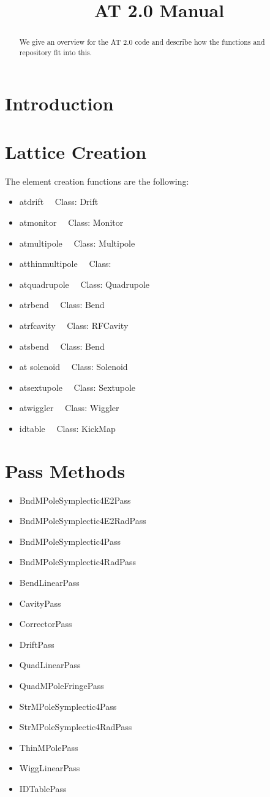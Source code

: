 \documentclass[acus]{article}
\begin{document}
\title{AT 2.0 Manual}
\maketitle
\begin{abstract}
We give an overview for the AT 2.0 code and describe how the functions and repository fit into this.
\end{abstract}


\section{Introduction}

\section{Lattice Creation}
The element creation functions are the following:
\begin{itemize}
\item atdrift \ \ Class: Drift
\item atmonitor \ \ Class: Monitor
\item atmultipole \ \ Class: Multipole
\item atthinmultipole \ \ Class: 
\item atquadrupole  \ \ Class: Quadrupole
\item atrbend  \ \ Class: Bend 
\item atrfcavity \ \ Class: RFCavity
\item atsbend \ \ Class: Bend
\item at solenoid \ \ Class: Solenoid
\item atsextupole  \ \ Class: Sextupole
\item atwiggler  \ \ Class: Wiggler
\item idtable  \ \ Class:  KickMap
\end{itemize}


\section{Pass Methods}

\begin{itemize}
\item BndMPoleSymplectic4E2Pass
\item BndMPoleSymplectic4E2RadPass
\item BndMPoleSymplectic4Pass
\item BndMPoleSymplectic4RadPass
\item BendLinearPass
\item CavityPass
\item CorrectorPass
\item DriftPass
\item QuadLinearPass
\item QuadMPoleFringePass
\item StrMPoleSymplectic4Pass
\item StrMPoleSymplectic4RadPass
\item ThinMPolePass
\item WiggLinearPass
\item IDTablePass
\end{itemize}
\end{document}
